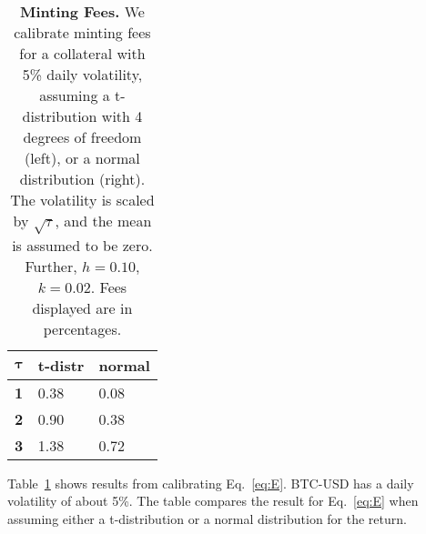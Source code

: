 \documentclass[english,11pt]{article}
\begin{document}
\begin{table}[]
\caption{\textbf{Minting Fees.}
    We calibrate minting fees for a collateral with 5\% daily volatility,
    assuming a t-distribution with 4 degrees of freedom (left), or a normal
    distribution (right). The volatility is scaled by $\sqrt{\tau}$, and the
    mean is assumed to be zero. Further, $h=0.10$, $k=0.02$. Fees displayed are in percentages.} %
	\begin{center}
	\begin{tabular}{lll}
	\hline
	\textbf{$\mathbf{\tau}$} & \textbf{t-distr} & \textbf{normal} \\
	\hline
	\textbf{1}                   & 0.38             & 0.08            \\
	\textbf{2}                   & 0.90             & 0.38            \\
	\textbf{3}                   & 1.38             & 0.72   \\        
	\hline
	\end{tabular}
	\label{tab:calibration}
	\end{center}
\end{table}

Table~\ref{tab:calibration} shows results
from calibrating Eq.~\eqref{eq:E}. BTC-USD has a daily volatility of about 5\%. 
The table compares the result for Eq.~\eqref{eq:E} when assuming
either a t-distribution or a normal distribution for the return.
\newpage


\end{document}
